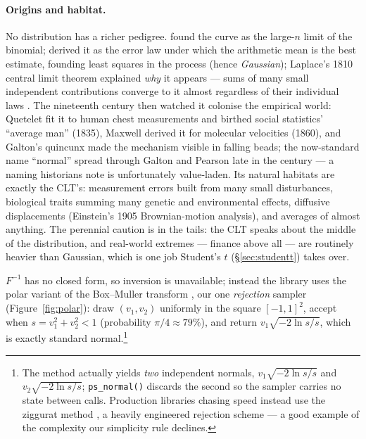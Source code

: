\documentclass[11pt]{article}
\numberwithin{equation}{section}
\begin{document}
\paragraph{Origins and habitat.}
No distribution has a richer pedigree.  \citet{demoivre1738} found the
curve as the large-$n$ limit of the binomial; \citet{gauss1809} derived it
as the error law under which the arithmetic mean is the best estimate,
founding least squares in the process (hence \emph{Gaussian}); Laplace's
1810 central limit theorem explained \emph{why} it appears --- sums of
many small independent contributions converge to it almost regardless of
their individual laws \citep{laplace1812}.  The nineteenth century then
watched it colonise the empirical world: Quetelet fit it to human chest
measurements and birthed social statistics' ``average man'' (1835),
Maxwell derived it for molecular velocities (1860), and Galton's quincunx
made the mechanism visible in falling beads; the now-standard name
``normal'' spread through Galton and Pearson late in the century ---
a naming historians note is unfortunately value-laden.  Its natural
habitats are exactly the CLT's: measurement errors built from many small
disturbances, biological traits summing many genetic and environmental
effects, diffusive displacements (Einstein's 1905 Brownian-motion
analysis), and averages of almost anything.  The perennial caution is in
the tails: the CLT speaks about the middle of the distribution, and
real-world extremes --- finance above all --- are routinely heavier than
Gaussian, which is one job Student's $t$ (\S\ref{sec:studentt}) takes
over.

$F^{-1}$ has no closed form, so inversion is unavailable; instead the
library uses the polar variant of the Box--Muller transform
\citep{boxmuller1958}, our one \emph{rejection} sampler
(Figure~\ref{fig:polar}): draw $(v_1,v_2)$ uniformly in the square
$[-1,1]^2$, accept when $s=v_1^2+v_2^2<1$ (probability $\pi/4\approx
79\%$), and return $v_1\sqrt{-2\ln s / s}$, which is exactly standard
normal.\footnote{The method actually yields \emph{two} independent
normals, $v_1\sqrt{-2\ln s/s}$ and $v_2\sqrt{-2\ln s/s}$;
\texttt{ps\_normal()} discards the second so the sampler carries no state
between calls.  Production libraries chasing speed instead use the
ziggurat method \citep{marsaglia2000ziggurat}, a heavily engineered
rejection scheme --- a good example of the complexity our simplicity rule
declines.}
\end{document}
